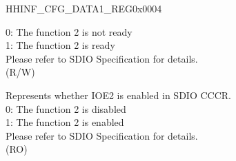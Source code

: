 \begin{register}{H}{HINF\_CFG\_DATA1\_REG}{0x0004}
\begin{regdesc}
\begin{reglist}
0: The function 2 is not ready\\
1: The function 2 is ready\\
Please refer to SDIO Specification for details.\\
(R/W)
\label{fielddesc:HINFIOENABLE2}\item [HINF\_IOENABLE2] Represents whether IOE2 is enabled in SDIO CCCR.\\
0: The function 2 is disabled\\
1: The function 2 is enabled\\
Please refer to SDIO Specification for details. \\
(RO)
\item [Continued on the next page...]
\end{reglist}\end{regdesc}
\end{register}
\addtocounter{Regfloat}{-1}
